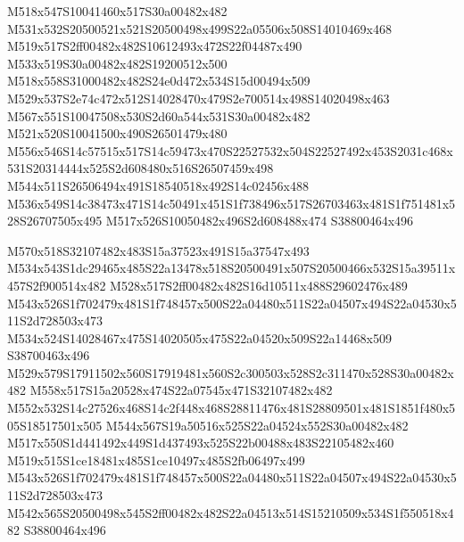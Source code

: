 \documentclass{article}
\begin{document}
\begin{multicols}{2}





M518x547S10041460x517S30a00482x482 M531x532S20500521x521S20500498x499S22a05506x508S14010469x468 M519x517S2ff00482x482S10612493x472S22f04487x490 M533x519S30a00482x482S19200512x500 M518x558S31000482x482S24e0d472x534S15d00494x509 M529x537S2e74c472x512S14028470x479S2e700514x498S14020498x463 M567x551S10047508x530S2d60a544x531S30a00482x482 M521x520S10041500x490S26501479x480 M556x546S14c57515x517S14c59473x470S22527532x504S22527492x453S2031c468x531S20314444x525S2d608480x516S26507459x498 M544x511S26506494x491S18540518x492S14c02456x488 M536x549S14c38473x471S14c50491x451S1f738496x517S26703463x481S1f751481x528S26707505x495 M517x526S10050482x496S2d608488x474 S38800464x496

M570x518S32107482x483S15a37523x491S15a37547x493 M534x543S1dc29465x485S22a13478x518S20500491x507S20500466x532S15a39511x457S2f900514x482 M528x517S2ff00482x482S16d10511x488S29602476x489 M543x526S1f702479x481S1f748457x500S22a04480x511S22a04507x494S22a04530x511S2d728503x473 M534x524S14028467x475S14020505x475S22a04520x509S22a14468x509 S38700463x496 M529x579S17911502x560S17919481x560S2c300503x528S2c311470x528S30a00482x482 M558x517S15a20528x474S22a07545x471S32107482x482 M552x532S14c27526x468S14c2f448x468S28811476x481S28809501x481S1851f480x505S18517501x505 M544x567S19a50516x525S22a04524x552S30a00482x482 M517x550S1d441492x449S1d437493x525S22b00488x483S22105482x460 M519x515S1ce18481x485S1ce10497x485S2fb06497x499 M543x526S1f702479x481S1f748457x500S22a04480x511S22a04507x494S22a04530x511S2d728503x473 M542x565S20500498x545S2ff00482x482S22a04513x514S15210509x534S1f550518x482 S38800464x496


\end{multicols}
\end{document}
